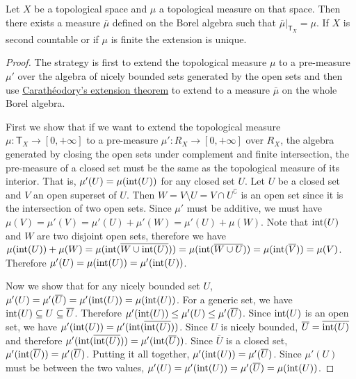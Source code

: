 \begin{mathSection}
\begin{thrm}
	Let $X$ be a topological space and $\mu$ a topological measure on that space. Then there exists a measure $\overline{\mu}$ defined on the Borel algebra such that $\left.\overline{\mu}\right|_{\textsf{T}_X} = \mu$. If $X$ is second countable or if $\mu$ is finite the extension is unique.
\end{thrm}

\begin{proof}
	The strategy is first to extend the topological measure $\mu$ to a pre-measure $\mu'$ over the algebra of nicely bounded sets generated by the open sets and then use \href{https://en.wikipedia.org/wiki/Carath%C3%A9odory's_extension_theorem}{Carathéodory's extension theorem} to extend to a measure $\bar{\mu}$ on the whole Borel algebra.
	
	First we show that if we want to extend the topological measure $\mu : \mathsf{T}_X \to [0,+\infty]$ to a pre-measure $\mu' : R_X \to [0,+\infty]$ over $R_X$, the algebra generated by closing the open sets under complement and finite intersection, the pre-measure of a closed set must be the same as the topological measure of its interior. That is, $\mu'(U) = \mu(\operatorname{int}(U))$ for any closed set $U$. Let $U$ be a closed set and $V$ an open superset of $U$. Then $W = V \setminus U = V \cap U^{\complement}$ is an open set since it is the intersection of two open sets. Since $\mu'$ must be additive, we must have $\mu(V) = \mu'(V) = \mu'(U) + \mu'(W) = \mu'(U) + \mu(W)$. Note that $\operatorname{int}(U)$ and $W$ are two disjoint open sets, therefore we have $\mu(\operatorname{int}(U)) + \mu(W) = \mu(\operatorname{int}(\overline{W \cup \operatorname{int}(U)})) = \mu(\operatorname{int}(\overline{W \cup U})) = \mu(\operatorname{int}(\overline{V})) = \mu(V)$. Therefore $\mu'(U) = \mu(\operatorname{int}(U)) = \mu'(\operatorname{int}(U))$.
	
	Now we show that for any nicely bounded set $U$, $\mu'(U) = \mu'(\overline{U}) = \mu'(\operatorname{int}(U)) = \mu(\operatorname{int}(U))$. For a generic set, we have $\operatorname{int}(U) \subseteq U \subseteq \overline{U}$. Therefore $\mu'(\operatorname{int}(U)) \leq \mu'(U) \leq \mu'(\overline{U})$. Since $\operatorname{int}(U)$ is an open set, we have $\mu'(\operatorname{int}(U)) = \mu'(\operatorname{int}(\overline{\operatorname{int}(U)}))$. Since $U$ is nicely bounded, $\overline{U} = \overline{\operatorname{int}(U)}$ and therefore $\mu'(\operatorname{int}(\overline{\operatorname{int}(U)})) = \mu'(\operatorname{int}(\overline{U}))$. Since $\overline{U}$ is a closed set, $\mu'(\operatorname{int}(\overline{U})) = \mu'(\overline{U})$. Putting it all together, $\mu'(\operatorname{int}(U)) = \mu'(\overline{U})$. Since $\mu'(U)$ must be between the two values, $\mu'(U) = \mu'(\operatorname{int}(U)) = \mu'(\overline{U}) = \mu(\operatorname{int}(U))$.
	

\end{proof}
\end{mathSection}
